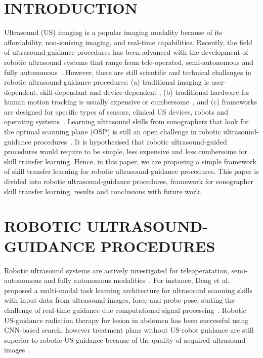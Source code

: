 \documentclass[a4paper, 10pt, conference]{ieeeconf}      %
\begin{document}
\section{INTRODUCTION}
Ultrasound (US) imaging is a popular imaging modality because of its affordability, 
non-ionising imaging, and real-time capabilities.
Recently, the field of ultrasound-guidance procedures has been advanced with the development of robotic ultrasound systems that range from tele-operated, semi-autonomous and fully autonomous~\cite{deng2021, vonHaxthausen2021, Gerlach2022}. 
However, there are still scientific and technical challenges in robotic ultrasound-guidance procedures: 
(a) traditional imaging is user-dependent, skill-dependant and device-dependent \cite{chen1997},
(b) traditional hardware for human motion tracking is usually expensive or cumbersome~\cite{Dressler2021}, and 
(c) frameworks are designed for specific types of sensors, clinical US devices, robots and operating systems~\cite{niu2022}.
Learning ultrasound skills from sonographers that look for the optimal scanning plane (OSP) is still an open challenge in robotic ultrasound-guidance procedures~\cite{deng2021}.
It is hypothesised that robotic ultrasound-guided procedures would require to be simple, less expensive and less cumbersome for skill transfer learning.
Hence, in this paper, we are proposing a simple framework of skill transfer learning for robotic ultrasound-guidance procedures.
This paper is divided into robotic ultrasound-guidance procedures, framework for sonographer skill transfer learning, results and conclusions with future work.

\section{ROBOTIC ULTRASOUND-GUIDANCE PROCEDURES}
Robotic ultrasound systems are actively investigated for teleoperatation, semi-autonomous and fully autonomous modalities~\cite{vonHaxthausen2021}.
For instance, Deng et al. proposed a multi-modal task learning architecture for ultrasound scanning skills with input data from ultrasound images, force and probe pose, stating the challenge of real-time guidance due computational signal processing~\cite{deng2021}.
Robotic US-guidance radiation therapy for lesion in abdomen has been successful using CNN-based search, however treatment plans without US-robot guidance are still superior to robotic US-guidance because of the quality of acquired ultrasound images~\cite{Gerlach2022}. 
\end{document}
